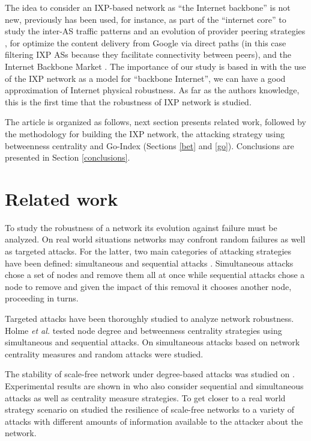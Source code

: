 \documentclass{sig-alternate-10pt}
\begin{document}
The idea to consider an IXP-based network as ``the Internet backbone'' is not new, previously has been used, for instance, as part of the ``internet core'' to study the inter-AS traffic patterns and an evolution of provider peering strategies \cite{labovitz2011internet}, for optimize the content delivery from Google via direct paths \cite{chiu2015we} (in this case filtering IXP ASs because they facilitate connectivity between peers), and the Internet Backbone Market \cite{buccirossi2005competition}. The importance of our study is based in with the use of the IXP network as a model for ``backbone Internet'', we can have a good approximation of Internet physical robustness.  As far as the authors knowledge, this is the first time that the robustness of IXP network is studied. 

The article is organized as follows, next section pre\-sents related work, followed by the methodology for building the IXP network, the attacking strategy using betweenness centrality and Go-Index (Sections \ref{bet} and \ref{go}). Conclusions are presented in Section \ref{conclusions}.

\section{Related work}
\label{relatedwork}

To study the robustness of a network its evolution against failure must be analyzed. On real world situations networks may confront random failures as well as targeted attacks.
For the latter, two main categories of attacking strategies have been defined: simultaneous and sequential attacks \cite{31holme2002attack}. Simultaneous attacks chose a set of nodes and remove them all at once while sequential attacks chose a node to remove and given the impact of this removal it chooses another node, proceeding in turns.

Targeted attacks have been thoroughly studied to analyze network robustness. Holme \textit{et al.} tested node degree and betweenness centrality strategies using simultaneous and sequential attacks. On \cite{33trajanovski2013robustness} simultaneous attacks based on network centrality measures and random attacks were studied.

The stability of scale-free network under degree-based attacks was studied on \cite{35yehezkel2012degree}. Experimental results are shown in \cite{iyer2013attack} who also consider sequential and simultaneous attacks as well as centrality measure strategies. To get closer to a real world strategy scenario on \cite{36gallos2006attack,37wu2007vulnerability} studied the resilience of scale-free networks to a variety of attacks with different amounts of information available to the attacker about the network.
\end{document}
